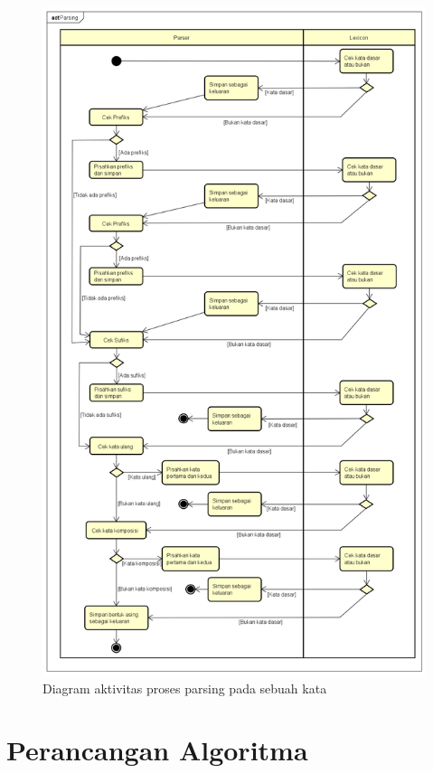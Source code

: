 \begin{figure}[H]
\centering
\includegraphics[scale=0.4]{Gambar/gambar-diagram-aktivitas-satu-kata}
\caption{Diagram aktivitas proses parsing pada sebuah kata} 
\label{gambar-diagram-aktivitas-satu-kata}
\end{figure}

\section{Perancangan Algoritma}
\label{sec:perancanganAlgoritma}

